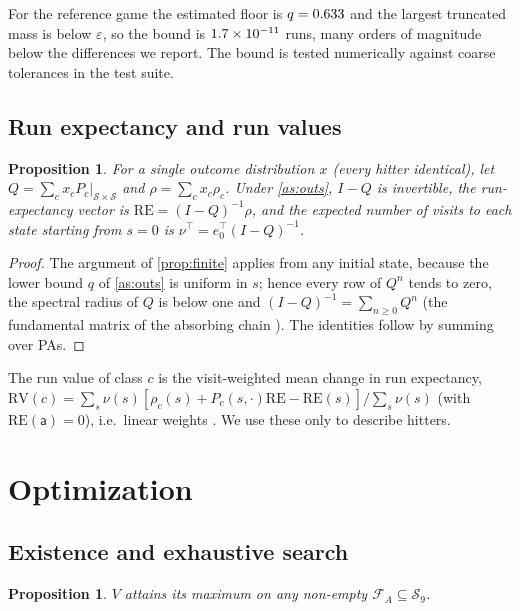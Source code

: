 \documentclass[11pt]{article}
\newtheorem{proposition}[theorem]{Proposition}
\theoremstyle{definition}
\theoremstyle{remark}
\newcommand{\cS}{\mathcal{S}}
\newcommand{\cF}{\mathcal{F}}
\newcommand{\abs}{\mathsf{a}}
\begin{document}
For the reference game the estimated floor is $q=0.633$ and the largest truncated mass is
below $\varepsilon$, so the bound is $1.7\times10^{-11}$ runs, many orders of magnitude below the differences we report. The bound is
tested numerically against coarse tolerances in the test suite.

\subsection{Run expectancy and run values}

\begin{proposition}\label{prop:re}
For a single outcome distribution $x$ (every hitter identical), let
$Q=\sum_cx_cP_c|_{\cS\times\cS}$ and $\rho=\sum_cx_c\rho_c$. Under \cref{as:outs}, $I-Q$ is
invertible, the run-expectancy vector is $\mathrm{RE}=(I-Q)^{-1}\rho$, and the expected number of
visits to each state starting from $s=0$ is $\nu^\top=e_0^\top(I-Q)^{-1}$.
\end{proposition}

\begin{proof}
The argument of \cref{prop:finite} applies from any initial state, because the lower bound $q$
of \cref{as:outs} is uniform in $s$; hence every row of $Q^n$ tends to zero, the spectral radius of
$Q$ is below one and
$(I-Q)^{-1}=\sum_{n\ge0}Q^n$ (the fundamental matrix of the absorbing chain \cite{kemeny1960}).
The identities follow by summing over PAs.
\end{proof}

The run value of class $c$ is the visit-weighted mean change in run expectancy,
$\mathrm{RV}(c)=\sum_s\nu(s)[\rho_c(s)+P_c(s,\cdot)\mathrm{RE}-\mathrm{RE}(s)]/\sum_s\nu(s)$ (with
$\mathrm{RE}(\abs)=0$), i.e.\ linear weights \cite{tango2007}. We use these only to describe
hitters.

\section{Optimization}\label{sec:optimization}

\subsection{Existence and exhaustive search}

\begin{proposition}\label{prop:exist}
$V$ attains its maximum on any non-empty $\cF_A\subseteq\mathcal{S}_9$.
\end{proposition}
\end{document}
